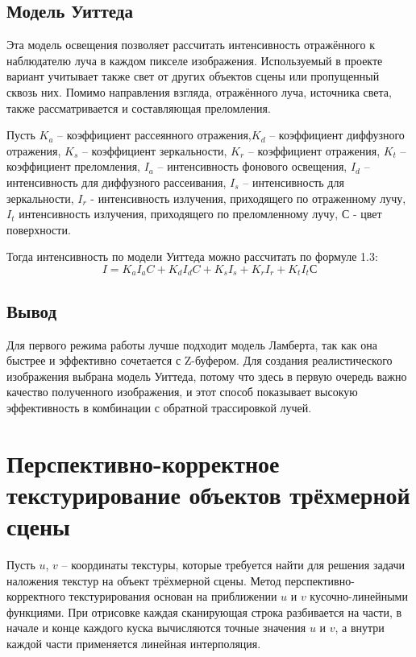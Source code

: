 \subsection{Модель Уиттеда}
Эта модель освещения позволяет рассчитать интенсивность отражённого к наблюдателю луча в каждом пикселе изображения. 
Используемый в проекте вариант учитывает также свет от других объектов сцены или пропущенный сквозь них. \cite{light}
Помимо направления взгляда, отражённого луча, источника света, также рассматривается и составляющая преломления. \cite{raytrac}

Пусть $ K_a $ – коэффициент рассеянного отражения,$ K_d $ – коэффициент диффузного отражения, $ K_s $ – коэффициент зеркальности, $ K_r $ – коэффициент отражения, 
$ K_t $ – коэффициент преломления, $ I_a $ – интенсивность фонового освещения, $ I_d $ – интенсивность для диффузного рассеивания, 
$ I_s $ – интенсивность для зеркальности, $I_r$ - интенсивность излучения, приходящего по отраженному лучу, $ I_t$ интенсивность излучения, приходящего по преломленному лучу, $С$ - цвет поверхности.

Тогда интенсивность по модели Уиттеда можно рассчитать по формуле 1.3:
\begin{equation}
I = K_aI_aC + K_dI_dC + K_sI_s + K_rI_r + K_tI_tС
\end{equation}

\subsection{Вывод}
Для первого режима работы лучше подходит модель Ламберта, так как она быстрее и эффективно сочетается с Z-буфером. 
Для создания реалистического изображения выбрана модель Уиттеда, потому что здесь в первую очередь важно качество полученного изображения, 
и этот способ показывает высокую эффективность в комбинации с обратной трассировкой лучей.

\section{Перспективно-корректное текстурирование объектов трёхмерной сцены}
Пусть  $u$, $v$ -- координаты текстуры, которые требуется найти для решения задачи наложения текстур на объект трёхмерной сцены.
Метод перспективно-корректного текстурирования основан на приближении $u$ и $v$ кусочно-линейными функциями.
При отрисовке каждая сканирующая строка разбивается на части, в начале и конце каждого куска вычисляются точные значения
$u$ и $v$, а внутри каждой части применяется линейная интерполяция. \cite{rojers}

